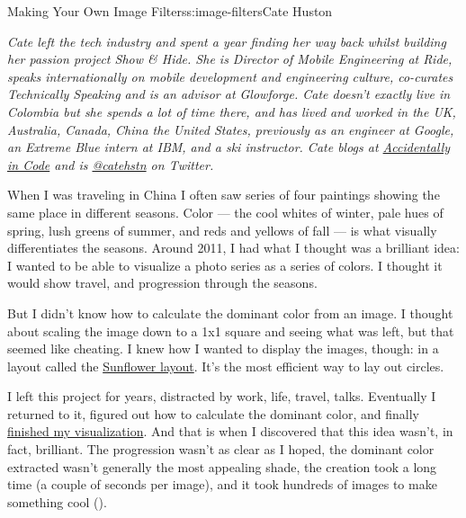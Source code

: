 \begin{aosachapter}{Making Your Own Image Filters}{s:image-filters}{Cate Huston}

\emph{Cate left the tech industry and spent a year finding her way back
whilst building her passion project Show \& Hide. She is Director of
Mobile Engineering at Ride, speaks internationally on mobile development
and engineering culture, co-curates Technically Speaking and is an
advisor at Glowforge. Cate doesn't exactly live in Colombia but she
spends a lot of time there, and has lived and worked in the UK,
Australia, Canada, China the United States, previously as an engineer at
Google, an Extreme Blue intern at IBM, and a ski instructor. Cate blogs
at \href{http://www.catehuston.com/blog/}{Accidentally in Code} and is
\href{https://twitter.com/catehstn}{@catehstn} on Twitter.}

\label{a-brilliant-idea-that-wasnt-all-that-brilliant}

When I was traveling in China I often saw series of four paintings
showing the same place in different seasons. Color --- the cool whites
of winter, pale hues of spring, lush greens of summer, and reds and
yellows of fall --- is what visually differentiates the seasons. Around
2011, I had what I thought was a brilliant idea: I wanted to be able to
visualize a photo series as a series of colors. I thought it would show
travel, and progression through the seasons.

But I didn't know how to calculate the dominant color from an image. I
thought about scaling the image down to a 1x1 square and seeing what was
left, but that seemed like cheating. I knew how I wanted to display the
images, though: in a layout called the
\href{http://www.catehuston.com/applets/Sunflower/index.html}{Sunflower
layout}. It's the most efficient way to lay out circles.

I left this project for years, distracted by work, life, travel, talks.
Eventually I returned to it, figured out how to calculate the dominant
color, and finally
\href{http://www.catehuston.com/blog/2013/09/02/visualising-a-photo-series/}{finished
my visualization}. And that is when I discovered that this idea wasn't,
in fact, brilliant. The progression wasn't as clear as I hoped, the
dominant color extracted wasn't generally the most appealing shade, the
creation took a long time (a couple of seconds per image), and it took
hundreds of images to make something cool
().


\end{aosachapter}
